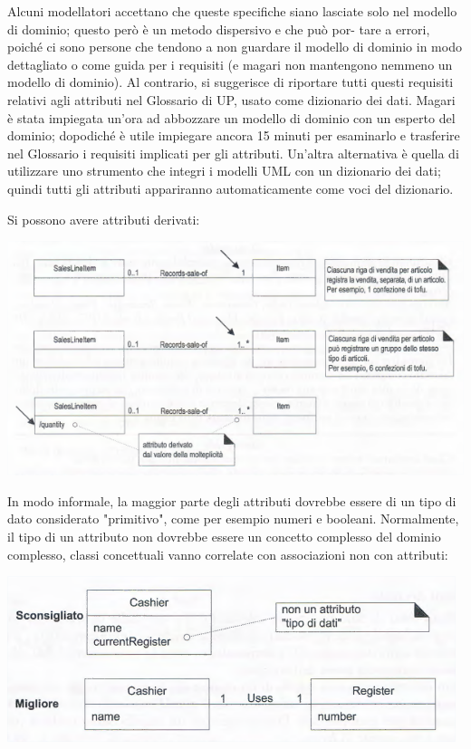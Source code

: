 \documentclass[a4paper,12pt, oneside]{book}
\begin{document}
\begin{shaded}
Alcuni modellatori accettano che queste specifiche siano
lasciate solo nel modello di dominio; questo però è un metodo dispersivo e che può por-
tare a errori, poiché ci sono persone che tendono a non guardare il modello di dominio
in modo dettagliato o come guida per i requisiti (e magari non mantengono nemmeno
un modello di dominio).
Al contrario, si suggerisce di riportare tutti questi requisiti relativi agli attributi nel Glossario di UP, usato come dizionario dei dati. Magari è stata impiegata un'ora ad abbozzare
un modello di dominio con un esperto del dominio; dopodiché è utile impiegare ancora
15 minuti per esaminarlo e trasferire nel Glossario i requisiti implicati per gli attributi.
Un'altra alternativa è quella di utilizzare uno strumento che integri i modelli UML con
un dizionario dei dati; quindi tutti gli attributi appariranno automaticamente come voci
del dizionario.
\end{shaded}
Si possono avere attributi derivati:
\begin{center}
	\includegraphics[scale=0.7]{img/attd3.png}
\end{center}
In modo informale, la maggior parte degli attributi dovrebbe essere di un tipo di dato considerato "primitivo", come per esempio numeri e booleani. Normalmente, il tipo di
un attributo non dovrebbe essere un concetto complesso del dominio complesso, classi concettuali vanno correlate con associazioni non con attributi:
\begin{center}
	\includegraphics[scale=0.7]{img/attd4.png}
\end{center}
\end{document}

